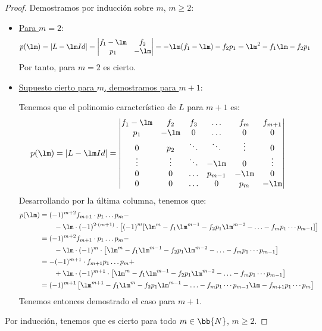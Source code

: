 \begin{proof}
    Demostramos por inducción sobre $m$, $m\geq 2$:
    \begin{itemize}
        \item \ul{Para $m=2$}:
        \begin{align*}
            p(\lm )&= |L-\lm Id| = \begin{vmatrix}
                f_1-\lm & f_2\\
                p_1 & -\lm
            \end{vmatrix} = -\lm(f_1-\lm) -f_2p_1 = \lm^2-f_1 \lm - f_2p_1
        \end{align*}
        Por tanto, para $m=2$ es cierto.

        \item \ul{Supuesto cierto para $m$, demostramos para $m+1$}:

        Tenemos que el polinomio característico de $L$ para $m+1$ es:
        \begin{align*}
            p(\lm) &= |L-\lm Id| = 
            \begin{vmatrix}
                f_1-\lm & f_2 & f_3 & \ldots & f_{m} & f_{m+1} \\
                p_1 & -\lm & 0 & \ldots & 0 & 0 \\
                0 & p_2 & \ddots & \ddots & \vdots & 0 \\
                \vdots & \vdots & \ddots & -\lm & 0 & \vdots \\
                0 & 0 & \ldots & p_{m-1} & -\lm & 0 \\
                0 & 0 & \ldots & 0 & p_{m} & -\lm \\
            \end{vmatrix}
        \end{align*}
        Desarrollando por la última columna, tenemos que:
        \begin{align*}
            p(\lm) &= (-1)^{m+2}f_{m+1}\cdot p_1\dots p_m -\\&\qquad -\lm\cdot (-1)^{2\cdot (m+1)}\cdot \left[{(-1)}^m [\lm^m - f_1\lm^{m-1} - f_2p_1\lm^{m-2} - \ldots - f_mp_1 \cdots p_{m-1}]\right]\\
            &= (-1)^{m+2}f_{m+1}\cdot p_1\dots p_m -\\&\qquad -\lm\cdot (-1)^{m}\cdot \left[\lm^m - f_1\lm^{m-1} - f_2p_1\lm^{m-2} - \ldots - f_mp_1 \cdots p_{m-1}\right]\\
            &= -(-1)^{m+1}\cdot f_{m+1} p_1\dots p_m +\\&\qquad +\lm\cdot (-1)^{m+1}\cdot \left[\lm^m - f_1\lm^{m-1} - f_2p_1\lm^{m-2} - \ldots - f_mp_1 \cdots p_{m-1}\right]\\
            &= (-1)^{m+1}\left[\lm^{m+1} - f_1\lm^{m} - f_2p_1\lm^{m-1} - \ldots - f_mp_1 \cdots p_{m-1}\lm -f_{m+1}p_1\cdots p_m\right]
        \end{align*}
        Tenemos entonces demostrado el caso para $m+1$.
    \end{itemize}
    Por inducción, tenemos que es cierto para todo $m\in \bb{N}$, $m\geq 2$.
\end{proof}

